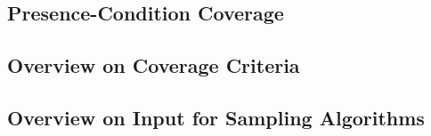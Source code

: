 \subsection{Presence-Condition Coverage}


\subsection{Overview on Coverage Criteria}

\subsection{Overview on Input for Sampling Algorithms}

%

\lessonslearned{
	\item \ldots
}{
	\item \ldots
}{
	\item \ldots
}














